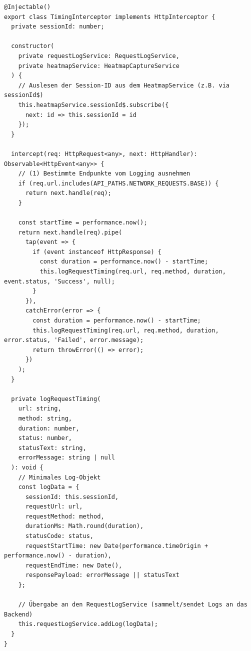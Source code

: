 \documentclass[12pt,oneside]{article}
\begin{document}
\begin{lstlisting}
@Injectable()
export class TimingInterceptor implements HttpInterceptor {
  private sessionId: number;

  constructor(
    private requestLogService: RequestLogService,
    private heatmapService: HeatmapCaptureService
  ) {
    // Auslesen der Session-ID aus dem HeatmapService (z.B. via sessionId$)
    this.heatmapService.sessionId$.subscribe({
      next: id => this.sessionId = id
    });
  }

  intercept(req: HttpRequest<any>, next: HttpHandler): Observable<HttpEvent<any>> {
    // (1) Bestimmte Endpunkte vom Logging ausnehmen
    if (req.url.includes(API_PATHS.NETWORK_REQUESTS.BASE)) {
      return next.handle(req);
    }

    const startTime = performance.now();
    return next.handle(req).pipe(
      tap(event => {
        if (event instanceof HttpResponse) {
          const duration = performance.now() - startTime;
          this.logRequestTiming(req.url, req.method, duration, event.status, 'Success', null);
        }
      }),
      catchError(error => {
        const duration = performance.now() - startTime;
        this.logRequestTiming(req.url, req.method, duration, error.status, 'Failed', error.message);
        return throwError(() => error);
      })
    );
  }

  private logRequestTiming(
    url: string,
    method: string,
    duration: number,
    status: number,
    statusText: string,
    errorMessage: string | null
  ): void {
    // Minimales Log-Objekt
    const logData = {
      sessionId: this.sessionId,
      requestUrl: url,
      requestMethod: method,
      durationMs: Math.round(duration),
      statusCode: status,
      requestStartTime: new Date(performance.timeOrigin + performance.now() - duration),
      requestEndTime: new Date(),
      responsePayload: errorMessage || statusText
    };

    // Übergabe an den RequestLogService (sammelt/sendet Logs an das Backend)
    this.requestLogService.addLog(logData);
  }
}
\end{lstlisting}
\end{document}
